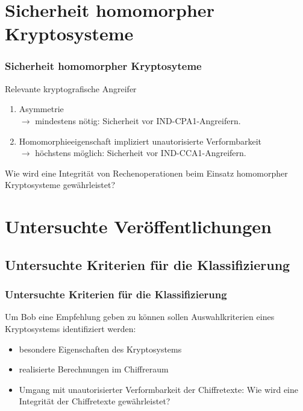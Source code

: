 \documentclass[handout,usenames,dvipsnames]{beamer}
\begin{document}
\section{Sicherheit homomorpher Kryptosysteme}
\begin{frame}
	\frametitle{Sicherheit homomorpher Kryptosyteme} 
	\begin{block}{Relevante kryptografische Angreifer}
	\begin{enumerate}
		\item Asymmetrie\\ $\rightarrow$ mindestens nötig: Sicherheit vor IND-CPA1-Angreifern.
		\item Homomorphieeigenschaft impliziert unautorisierte Verformbarkeit\\ $\rightarrow$ höchstens möglich: Sicherheit vor IND-CCA1-Angreifern.
	\end{enumerate}
	\end{block}

	Wie wird eine Integrität von Rechenoperationen beim Einsatz homomorpher Kryptosysteme gewährleistet? 
\end{frame}

\section{Untersuchte Veröffentlichungen}
\subsection{Untersuchte Kriterien für die Klassifizierung}
\begin{frame}
	\frametitle{Untersuchte Kriterien für die Klassifizierung}
	Um Bob eine Empfehlung geben zu können sollen Auswahlkriterien eines Kryptosystems identifiziert werden:
	\begin{itemize}
		\item besondere Eigenschaften des Kryptosystems
		\item realisierte Berechnungen im Chiffreraum
		\item Umgang mit unautorisierter Verformbarkeit der Chiffretexte: Wie wird eine Integrität der Chiffretexte gewährleistet?
	\end{itemize}
\end{frame}
\end{document}
